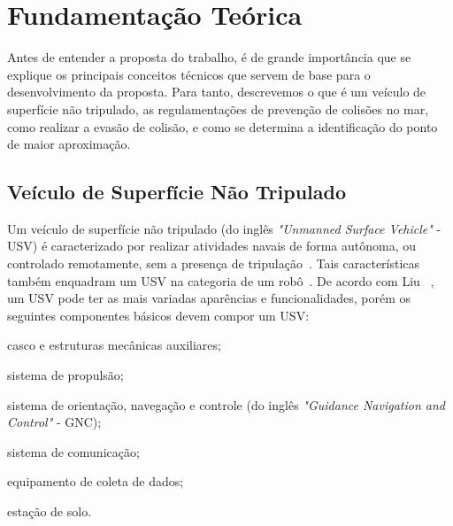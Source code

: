 


\chapter{Fundamentação Teórica}\label{chap2:fund_teo}
    Antes de entender a proposta do trabalho, é de grande importância que se explique os principais conceitos técnicos que servem de base para o desenvolvimento da proposta. Para tanto, descrevemos o que é um veículo de superfície não tripulado, as regulamentações de prevenção de colisões no mar, como realizar a evasão de colisão, e como se determina a identificação do ponto de maior aproximação.
    \section{Veículo de Superfície Não Tripulado}\label{subchap2:USV}
        Um veículo de superfície não tripulado (do inglês \textit{"Unmanned Surface Vehicle"} - USV) é caracterizado por realizar atividades navais de forma autônoma, ou controlado remotamente, sem a presença de tripulação~\cite{LIU201671}. Tais características também enquadram um USV na categoria de um robô~\cite{JURAK2020}.
        De acordo com Liu \etal~\cite{LIU201671}, um USV pode ter as mais variadas aparências e funcionalidades, porém os seguintes componentes básicos devem compor um USV: 
        \begin{enumerate*}[label=\alph*)]
            \item casco e estruturas mecânicas auxiliares;
            \item sistema de propulsão;
            \item sistema de orientação, navegação e controle (do inglês \textit{"Guidance Navigation and Control"} - GNC);
            \item sistema de comunicação;
            \item equipamento de coleta de dados;
            \item estação de solo.
        \end{enumerate*}
        
